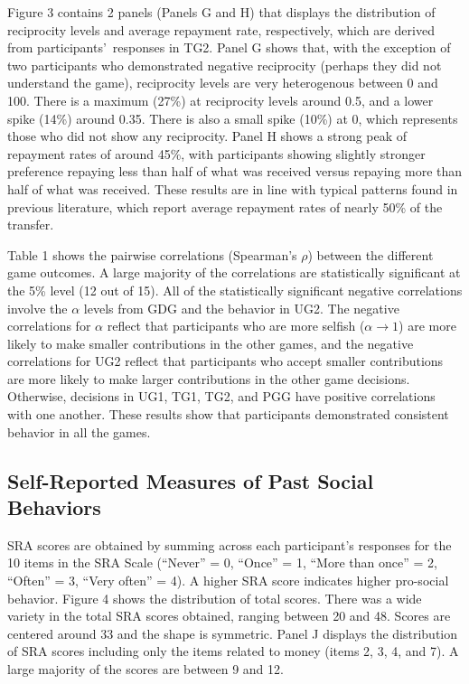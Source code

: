 \documentclass[12pt]{article}
\begin{document}
Figure 3 contains 2 panels (Panels G and H) that displays the distribution of reciprocity levels and average repayment rate, respectively, which are derived from participants\rq \ responses in TG2. Panel G shows that, with the exception of two participants who demonstrated negative reciprocity (perhaps they did not understand the game), reciprocity levels are very heterogenous between 0 and 100. There is a maximum (27\%) at reciprocity levels around 0.5, and a lower spike (14\%) around 0.35. There is also a small spike (10\%) at 0, which represents those who did not show any reciprocity. Panel H shows a strong peak of repayment rates of around 45\%, with participants showing slightly stronger preference repaying less than half of what was received versus repaying more than half of what was received. These results are in line with typical patterns found in previous literature, which report average repayment rates of nearly 50\% of the transfer.

Table 1 shows the pairwise correlations (Spearman\rq s \(\rho\)) between the different game outcomes. A large majority of the correlations are statistically significant at the 5\% level (12 out of 15). All of the statistically significant negative correlations involve the \(\alpha\) levels from GDG and the behavior in UG2. The negative correlations for \(\alpha\) reflect that participants who are more selfish (\(\alpha \rightarrow 1\)) are more likely to make smaller contributions in the other games, and the negative correlations for UG2 reflect that participants who accept smaller contributions are more likely to make larger contributions in the other game decisions. Otherwise, decisions in UG1, TG1, TG2, and PGG have positive correlations with one another.
These results show that participants demonstrated consistent behavior in all the games.

\subsection{Self-Reported Measures of Past Social Behaviors}

SRA scores are obtained by summing across each participant\rq s responses for the 10 items in the SRA Scale (``Never'' = 0, ``Once'' = 1, ``More than once'' = 2, ``Often'' = 3, ``Very often'' = 4). A higher SRA score indicates higher pro-social behavior. Figure 4 shows the distribution of total scores. There was a wide variety in the total SRA scores obtained, ranging between 20 and 48. Scores are centered around 33 and the shape is symmetric. Panel J displays the distribution of SRA scores including only the items related to money (items 2, 3, 4, and 7). A large majority of the scores are between 9 and 12.
\end{document}

